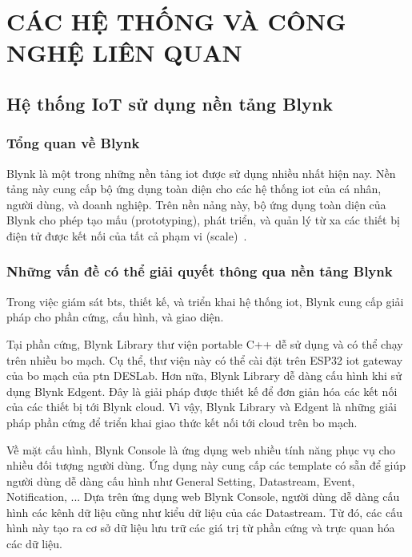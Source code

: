 \chapter{CÁC HỆ THỐNG VÀ CÔNG NGHỆ LIÊN QUAN}
\label{Chapter2}

\section{Hệ thống IoT sử dụng nền tảng Blynk}

\subsection{Tổng quan về Blynk}

Blynk là một trong những nền tảng \acrshort{iot} được sử dụng nhiều nhất hiện nay. Nền tảng này cung cấp bộ ứng dụng toàn diện cho các hệ thống \acrshort{iot} của cá nhân, người dùng, và doanh nghiệp. Trên nền nảng này, bộ ứng dụng toàn diện của Blynk cho phép tạo mấu (prototyping), phát triển, và quản lý từ xa các thiết bị điện tử được kết nối của tất cả phạm vi (scale)~\cite{Blynk-Overview}.

\subsection{Những vấn đề có thể giải quyết thông qua nền tảng Blynk}

Trong việc giám sát \acrshort{bts}, thiết kế, và triển khai hệ thống \acrshort{iot}, Blynk cung cấp giải pháp cho phần cứng, cấu hình, và giao diện.

Tại phần cứng, Blynk Library thư viện portable C++ dễ sử dụng và có thể chạy trên nhiều bo mạch. Cụ thể, thư viện này có thể cài đặt trên ESP32 \acrshort{iot} gateway của bo mạch của \acrshort{ptn} DESLab. Hơn nữa, Blynk Library dễ dàng cấu hình khi sử dụng Blynk Edgent. Đây là giải pháp được thiết kế để đơn giản hóa các kết nối của các thiết bị tới Blynk cloud. Vì vậy, Blynk Library và Edgent là những giải pháp phần cứng để triển khai giao thức kết nối tới cloud trên bo mạch.

Về mặt cấu hình, Blynk Console là ứng dụng web nhiều tính năng phục vụ cho nhiều đối tượng người dùng. Ứng dụng này cung cấp các template có sẵn để giúp người dùng dễ dàng cấu hình như General Setting, Datastream, Event, Notification, ... Dựa trên ứng dụng web Blynk Console, người dùng dễ dàng cấu hình các kênh dữ liệu cũng như kiểu dữ liệu của các Datastream. Từ đó, các cấu hình này tạo ra cơ sở dữ liệu lưu trữ các giá trị từ phần cứng và trực quan hóa các dữ liệu.

